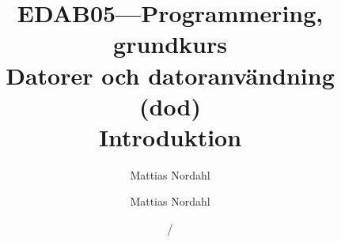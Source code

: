 \documentclass[handout]{beamer}
\author[]{Mattias Nordahl}
\institute{\url{mattias.nordahl@cs.lth.se}}
\date{}
\author[]{Mattias Nordahl}
\institute{\url{mattias.nordahl@cs.lth.se}}
\date{}
\begin{document}
 

\title{{\small\bf EDAB05---Programmering, grundkurs}\\Datorer och datoranvändning (dod)\\Introduktion} 

\frame[plain]{
\maketitle

\vspace{-2\baselineskip}
}

\date{\the\year/\the\numexpr{}} 


\end{document}
